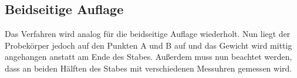 \subsection{Beidseitige Auflage}
Das Verfahren wird analog für die beidseitige Auflage wiederholt. Nun liegt der Probekörper jedoch auf den Punkten A und B auf und das Gewicht wird mittig 
angehangen anstatt am Ende des Stabes. Außerdem muss nun beachtet werden, dass an beiden Hälften des Stabes mit verschiedenen Messuhren gemessen wird.




